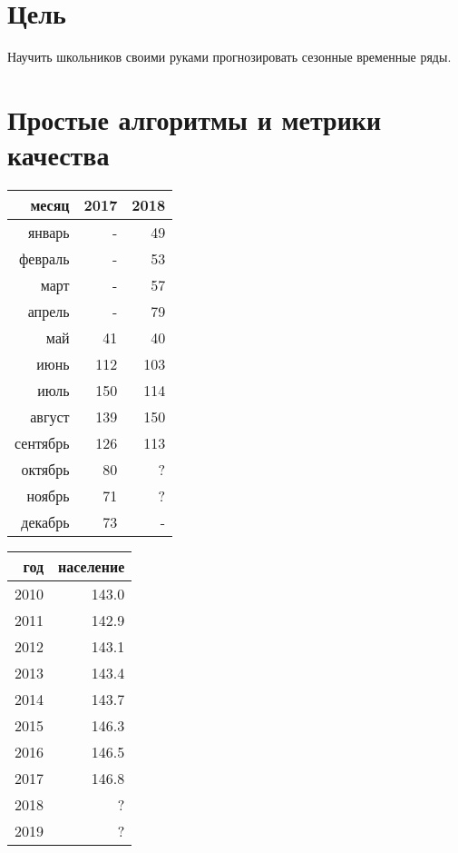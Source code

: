 \documentclass[12pt]{article}
\theoremstyle{definition}
\begin{document}
\tableofcontents{}

\section*{Цель}
Научить школьников своими руками прогнозировать сезонные временные ряды. 


\newpage
\setcounter{section}{0}
\section{Простые алгоритмы и метрики качества}

\begin{multicols}{2}
\begin{tabular}{rrr}
  \toprule
  месяц & 2017 & 2018 \\
  \midrule
  январь & - & 49 \\
  февраль & - & 53 \\
  март & - & 57 \\
  апрель & - & 79 \\
  май & 41 & 40 \\
  июнь & 112 & 103 \\
  июль & 150 & 114 \\
  август  & 139 & 150 \\
  сентябрь  & 126 & 113 \\
  октябрь  & 80 & ? \\
  ноябрь  & 71 & ? \\
  декабрь  & 73 & - \\
  \bottomrule
\end{tabular}


\begin{tabular}{rr}
  \toprule
  год & население  \\
  \midrule
  2010 & 143.0 \\
  2011 & 142.9 \\
  2012 & 143.1 \\
  2013 & 143.4 \\
  2014 & 143.7 \\
  2015 & 146.3\\
  2016 & 146.5 \\
  2017 & 146.8 \\
  2018 & ? \\
  2019 & ? \\
  \bottomrule
\end{tabular}

\end{multicols}
\end{document}
